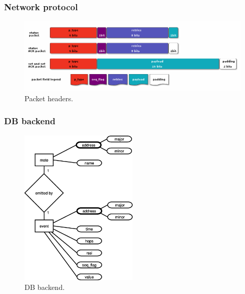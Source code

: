 \documentclass{beamer}
\begin{document}
\begin{frame}
\frametitle{Network protocol}

	\begin{center}
		\begin{figure}
			\includegraphics[width=\textwidth]{packet.png}
			\caption{Packet headers.}
		\end{figure}
	\end{center}
	
\end{frame}

\begin{frame}
\frametitle{DB backend}

	\begin{center}
		\begin{figure}
			\includegraphics[width=0.5\textwidth]{dbbackend.eps}
			\caption{DB backend.}
		\end{figure}
	\end{center}

\end{frame}
\end{document}
